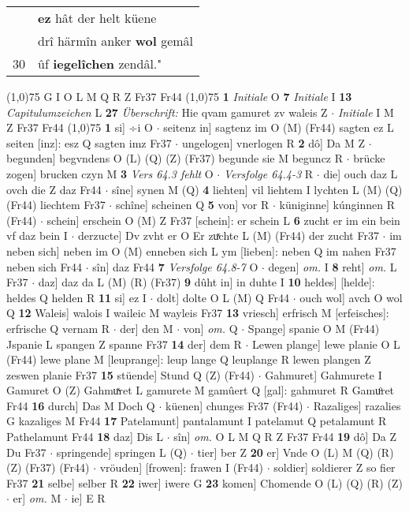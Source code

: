 \documentclass[8pt,a4paper,notitlepage]{article}
\begin{document}
\begin{table}[ht]
\begin{minipage}[t]{0.5\linewidth}
\begin{tabular}{rl}
 & \textbf{ez} hât der helt küene\\ 
 & drî härmîn anker \textbf{wol} gemâl\\ 
30 & ûf \textbf{iegelîchen} zendâl."\\ 
\end{tabular}
\scriptsize
\line(1,0){75} \newline
G I O L M Q R Z Fr37 Fr44 \newline
\line(1,0){75} \newline
\textbf{1} \textit{Initiale} O  \textbf{7} \textit{Initiale} I  \textbf{13} \textit{Capitulumzeichen} L  \textbf{27} \textit{Überschrift:} Hie qvam gamuret zv waleis Z   $\cdot$ \textit{Initiale} I M Z Fr37 Fr44  \newline
\line(1,0){75} \newline
\textbf{1} si] ÷i O  $\cdot$ seitenz in] sagtenz im O (M) (Fr44) sagten ez L seiten [inz]: esz Q sagten imz Fr37  $\cdot$ ungelogen] vnerlogen R \textbf{2} dô] Da M Z  $\cdot$ begunden] begvndens O (L) (Q) (Z) (Fr37) begunde sie M beguncz R  $\cdot$ brücke zogen] brucken czyn M \textbf{3} \textit{Vers 64.3 fehlt} O   $\cdot$ \textit{Versfolge 64.4-3} R   $\cdot$ die] ouch daz L ovch die Z daz Fr44  $\cdot$ sîne] synen M (Q) \textbf{4} liehten] vil liehtem I lychten L (M) (Q) (Fr44) liechtem Fr37  $\cdot$ schîne] scheinen Q \textbf{5} von] vor R  $\cdot$ küniginne] kúnginnen R (Fr44)  $\cdot$ schein] erschein O (M) Z Fr37 [schein]: er schein L \textbf{6} zucht er im ein bein vf daz bein I  $\cdot$ derzucte] Dv zvht er O Er zuͯchte L (M) (Fr44) der zucht Fr37  $\cdot$ im neben sich] neben im O (M) enneben sich L ym [lieben]: neben Q im nahen Fr37 neben sich Fr44  $\cdot$ sîn] daz Fr44 \textbf{7} \textit{Versfolge 64.8-7} O   $\cdot$ degen] \textit{om.} I \textbf{8} reht] \textit{om.} L Fr37  $\cdot$ daz] daz da L (M) (R) (Fr37) \textbf{9} dûht in] in duhte I \textbf{10} heldes] [helde]: heldes Q helden R \textbf{11} si] ez I  $\cdot$ dolt] dolte O L (M) Q Fr44  $\cdot$ ouch wol] avch O wol Q \textbf{12} Waleis] walois I waileic M wayleis Fr37 \textbf{13} vriesch] erfrisch M [erfeisches]: erfrische Q vernam R  $\cdot$ der] den M  $\cdot$ von] \textit{om.} Q  $\cdot$ Spange] spanie O M (Fr44) Jspanie L spangen Z spanne Fr37 \textbf{14} der] dem R  $\cdot$ Lewen plange] lewe planie O L (Fr44) lewe plane M [leuprange]: leup lange Q leuplange R lewen plangen Z zeswen planie Fr37 \textbf{15} stüende] Stund Q (Z) (Fr44)  $\cdot$ Gahmuret] Gahmurete I Gamuret O (Z) Gahmuͯret L gamurete M gamûert Q [gal]: gahmuret R Gamuͦret Fr44 \textbf{16} durch] Das M Doch Q  $\cdot$ küenen] chunges Fr37 (Fr44)  $\cdot$ Razaliges] razalies G kazaliges M Fr44 \textbf{17} Patelamunt] pantalamunt I patelamut Q petalamunt R Pathelamunt Fr44 \textbf{18} daz] Dis L  $\cdot$ sîn] \textit{om.} O L M Q R Z Fr37 Fr44 \textbf{19} dô] Da Z Du Fr37  $\cdot$ springende] springen L (Q)  $\cdot$ tier] ber Z \textbf{20} er] Vnde O (L) M (Q) (R) (Z) (Fr37) (Fr44)  $\cdot$ vröuden] [frowen]: frawen I (Fr44)  $\cdot$ soldier] soldierer Z so fier Fr37 \textbf{21} selbe] selber R \textbf{22} iwer] iwere G \textbf{23} komen] Chomende O (L) (Q) (R) (Z)  $\cdot$ er] \textit{om.} M  $\cdot$ ie] E R 
\end{minipage}
\end{table}
\end{document}
